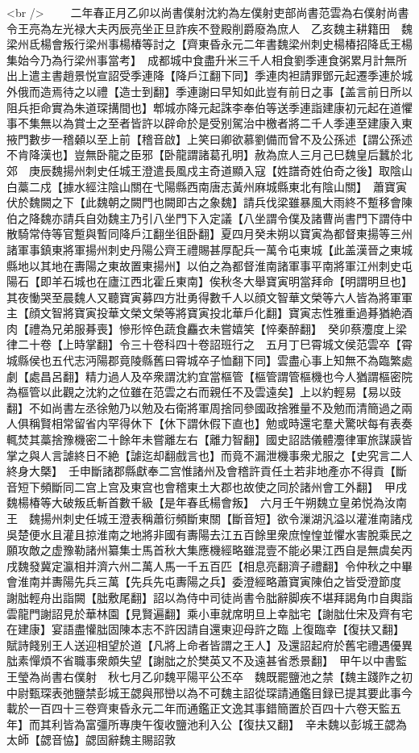 <br />
　　二年春正月乙卯以尚書僕射沈約為左僕射吏部尚書范雲為右僕射尚書令王亮為左光禄大夫丙辰亮坐正旦詐疾不登殿削爵廢為庶人　乙亥魏主耕籍田　魏梁州氐楊會叛行梁州事楊椿等討之【齊東昏永元二年書魏梁州刺史楊椿招降氐王楊集始今乃為行梁州事當考】　成都城中食盡升米三千人相食劉季連食粥累月計無所出上遣主書趙景悦宣詔受季連降【降戶江翻下同】季連肉袒請罪鄧元起遷季連於城外俄而造焉待之以禮【造士到翻】季連謝曰早知如此豈有前日之事【盖言前日所以阻兵拒命實為朱道琛搆間也】郫城亦降元起誅李奉伯等送季連詣建康初元起在道懼事不集無以為賞士之至者皆許以辟命於是受别駕治中檄者將二千人季連至建康入東掖門數步一稽顙以至上前【稽音啟】上笑曰卿欲慕劉備而曾不及公孫述【謂公孫述不肯降漢也】豈無卧龍之臣邪【卧龍謂諸葛孔明】赦為庶人三月己巳魏皇后蠶於北郊　庚辰魏揚州刺史任城王澄遣長風戍主奇道顯入寇【姓譜奇姓伯奇之後】取陰山白藁二戍【據水經注陰山關在弋陽縣西南唐志黃州麻城縣東北有陰山關】　蕭寶寅伏於魏闕之下【此魏朝之闕門也闕即古之象魏】請兵伐梁雖暴風大雨終不蹔移會陳伯之降魏亦請兵自効魏主乃引八坐門下入定議【八坐謂令僕及諸曹尚書門下謂侍中散騎常侍等官蹔與暫同降戶江翻坐徂卧翻】夏四月癸未朔以寶寅為都督東揚等三州諸軍事鎮東將軍揚州刺史丹陽公齊王禮賜甚厚配兵一萬令屯東城【此盖漢晉之東城縣地以其地在夀陽之東故置東揚州】以伯之為都督淮南諸軍事平南將軍江州刺史屯陽石【即羊石城也在廬江西北霍丘東南】俟秋冬大舉寶寅明當拜命【明謂明旦也】其夜慟哭至晨魏人又聽寶寅募四方壯勇得數千人以顔文智華文榮等六人皆為將軍軍主【顔文智將寶寅投華文榮文榮等將寶寅投北華戶化翻】寶寅志性雅重過朞猶絶酒肉【禮為兄弟服朞喪】慘形悴色蔬食麤衣未嘗嬉笑【悴秦醉翻】　癸卯蔡灋度上梁律二十卷【上時掌翻】令三十卷科四十卷詔班行之　五月丁巳霄城文侯范雲卒【霄城縣侯也五代志沔陽郡竟陵縣舊曰霄城卒子恤翻下同】雲盡心事上知無不為臨繁處劇【處昌呂翻】精力過人及卒衆謂沈約宜當樞管【樞管謂管樞機也今人猶謂樞密院為樞管以此觀之沈約之位雖在范雲之右而親任不及雲遠矣】上以約輕易【易以豉翻】不如尚書左丞徐勉乃以勉及右衛將軍周捨同參國政捨雅量不及勉而清簡過之兩人俱稱賢相常留省内罕得休下【休下謂休假下直也】勉或時還宅羣犬驚吠每有表奏輒焚其藁捨豫機密二十餘年未嘗離左右【離力智翻】國史詔誥儀體灋律軍旅謀謨皆掌之與人言謔終日不絶【謔迄却翻戲言也】而竟不漏泄機事衆尤服之【史究言二人終身大槩】　壬申斷諸郡縣獻奉二宫惟諸州及會稽許貢任土若非地產亦不得貢【斷音短下頻斷同二宫上宫及東宫也會稽東土大郡也故使之同於諸州會工外翻】　甲戌魏楊椿等大破叛氐斬首數千級【是年春氐楊會叛】　六月壬午朔魏立皇弟悦為汝南王　魏揚州刺史任城王澄表稱蕭衍頻斷東關【斷音短】欲令漅湖汎溢以灌淮南諸戍吳楚便水且灌且掠淮南之地將非國有夀陽去江五百餘里衆庶惶惶並懼水害脫乘民之願攻敵之虚豫勒諸州纂集士馬首秋大集應機經略雖混壹不能必果江西自是無虞矣丙戌魏發冀定瀛相并濟六州二萬人馬一千五百匹【相息亮翻濟子禮翻】令仲秋之中畢會淮南并夀陽先兵三萬【先兵先屯夀陽之兵】委澄經略蕭寶寅陳伯之皆受澄節度　謝朏輕舟出詣闕【朏敷尾翻】詔以為侍中司徒尚書令朏辭脚疾不堪拜謁角巾自輿詣雲龍門謝詔見於華林園【見賢遍翻】乘小車就席明旦上幸朏宅【謝朏仕宋及齊有宅在建康】宴語盡懽朏固陳本志不許因請自還東迎母許之臨上復臨幸【復扶又翻】賦詩餞别王人送迎相望於道【凡將上命者皆謂之王人】及還詔起府於舊宅禮遇優異朏素憚煩不省職事衆頗失望【謝朏之於樊英又不及遠甚省悉景翻】　甲午以中書監王瑩為尚書右僕射　秋七月乙卯魏平陽平公丕卒　魏既罷鹽池之禁【魏主踐阼之初中尉甄琛表弛鹽禁彭城王勰與邢巒以為不可魏主詔從琛請通鑑目録已提其要此事今載於一百四十三卷齊東昏永元二年而通鑑正文逸其事錯簡置於百四十六卷天監五年】而其利皆為富彊所專庚午復收鹽池利入公【復扶又翻】　辛未魏以彭城王勰為太師【勰音恊】勰固辭魏主賜詔敦